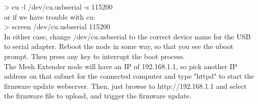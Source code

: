 > cu -l /dev/cu.usbserial -s 115200\\

or if we have trouble with cu: \\ 

> screen /dev/cu.usbserial 115200 \\

In either case, change /dev/cu.usbserial to the correct device name for the USB to serial adapter. Reboot the node in some way, so that you see the uboot prompt. Then press any key to interrupt the boot process.\\
The Mesh Extender node will have an IP of 192.168.1.1, so pick another IP address on that subnet for the connected computer and type "httpd" to start the firmware update webserver. Then, just browse to http://192.168.1.1 and select the firmware file to upload, and trigger the firmware update.  
